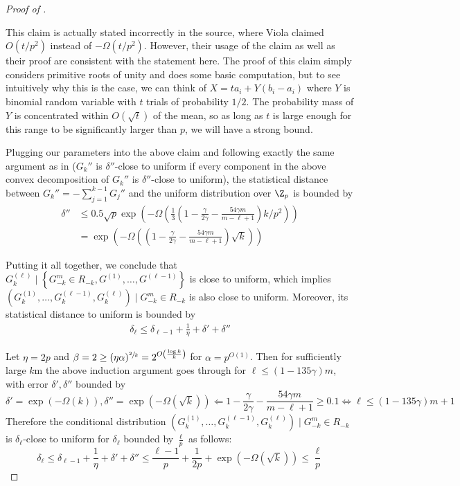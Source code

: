 \documentclass{toc}
\newcommand{\set}[1]{{\left \{{#1} \right \}}}
\newcommand{\Cond}{\;\Big|\;}
\newcommand{\error}{\ensuremath{\delta}}
\newcommand{\bigo}[1]{\ensuremath{{{O} \left( {#1} \right)}}}
\newcommand{\bigomega}[1]{\ensuremath{{\Omega \left( {#1} \right)}}}
\begin{document}
\begin{proof}[Proof of ]
		{\color{black}\begin{remark}
		\label{remark:uniform}
		This claim is actually stated incorrectly in the source, where Viola claimed $O(t/p^2)$ instead of $-\Omega(t/p^2)$. However, their usage of the claim as well as their proof are consistent with the statement here. The proof of this claim simply considers primitive roots of unity and does some basic computation, but to see intuitively why this is the case, we can think of $X = ta_i + Y(b_i - a_i)$ where $Y$ is binomial random variable with $t$ trials of probability $1/2$. The probability mass of $Y$ is concentrated within $O(\sqrt{t})$ of the mean, so as long as $t$ is large enough for this range to be significantly larger than $p$, we will have a strong bound.
		\end{remark}
		}

		Plugging our parameters into the above claim and following exactly the same argument as in \cite{Viola:2013we} ($G_k''$ is $\error''$-close to uniform if every component in the above convex decomposition of $G_k''$ is $\error''$-close to uniform),
		the statistical distance between $G_k''=-\sum_{j=1}^{k-1} G_j''$ and the uniform distribution over $\Z_p$ is bounded by
		\begin{align*}
			\error'' &\le 0.5\sqrt{p}\exp\left(-\bigomega{\frac{1}{3} \left(1-\frac{\gamma}{2\gamma}- \frac {54\gamma m}{m-\ell+1}\right)k/p^2} \right)\\
			&= \exp\left(-\bigomega{\left(1-\frac{\gamma}{2\gamma}- \frac {54\gamma m}{m-\ell+1}\right)\sqrt{k}} \right)
		\end{align*}


		Putting it all together, we conclude that $G_k^{(\ell)}\Cond\set{G_{-k}^m\in R_{-k}, G^{(1)},\dots,G^{(\ell-1)}}$ is close to uniform,
		which implies 
		$\left(G_k^{(1)},\dots,G_k^{(\ell-1)},G_k^{(\ell)}\right)\Cond G_{-k}^m \in R_{-k}$ is also close to uniform.
		Moreover, its statistical distance to uniform is bounded by 
		\begin{align*}
			\error_{\ell} \le \error_{\ell-1}+ \frac{1}{\eta}+\error'+\error''
		\end{align*}

		Let $\eta=2p$ and $\beta=2\ge (\eta\alpha)^{\sfrac{2}{k}}=2^{\bigo{\frac{\log k}{k}}}$ for $\alpha=p^\bigo{1}$.
		Then for sufficiently large $k$m 
		the above induction argument goes through for $\ell\le (1-135\gamma) m$, with error $\error',\error''$ bounded by
		$$ \error'= \exp\left(-\bigomega{{k}}\right), \error''=\exp\left(-\bigomega{\sqrt{k}}\right) \Longleftarrow 1-\frac{\gamma}{2\gamma}- \frac {54\gamma m}{m-\ell+1}
		\ge 0.1 \Longleftrightarrow \ell \le (1-135\gamma) m +1 $$
		Therefore the conditional distribution $\left(G_k^{(1)},\dots,G_k^{(\ell-1)},G_k^{(\ell)}\right)\Cond G_{-k}^m \in R_{-k}$ is $\error_{\ell}$-close to uniform for $\error_{\ell}$ bounded by $\frac{\ell}{p}$ as follows:
		$$\error_{\ell} \le \error_{\ell-1}+\frac{1}{\eta}+\error'+\error''\le \frac{\ell-1}{p}+\frac{1}{2p}+ \exp\left(-\bigomega{\sqrt{k}}\right)\le \frac{\ell}{p}$$


\end{proof}
\end{document}
